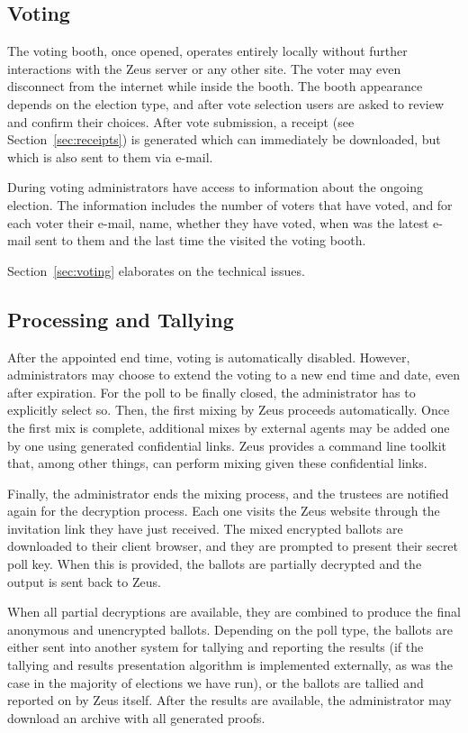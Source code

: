 \documentclass[letterpaper,10pt]{article}
\begin{document}
\subsection{Voting}
The voting booth, once opened, operates entirely locally without
further interactions with the Zeus server or any other site.
The voter may even disconnect from the internet while inside the booth.
The booth appearance depends on the election type, and after vote
selection users are asked to review and confirm their choices.
After vote submission, a receipt (see Section~\ref{sec:receipts}) is
generated which can immediately be downloaded, but which is also sent
to them via e-mail.

During voting administrators have access to information about the
ongoing election. The information includes the number of voters that
have voted, and for each voter their e-mail, name, whether they have
voted, when was the latest e-mail sent to them and the last time the
visited the voting booth.

Section~\ref{sec:voting} elaborates on the technical issues.

\subsection{Processing and Tallying}
After the appointed end time, voting is automatically disabled.
However, administrators may choose to extend the voting to a new end
time and date, even after expiration.
For the poll to be finally closed,
the administrator has to explicitly select so.
Then, the first mixing by Zeus proceeds automatically.
Once the first mix is complete, additional mixes by external agents
may be added one by one using generated confidential links.
Zeus provides a command line toolkit that, among other things, can
perform mixing given these confidential links.

Finally, the administrator ends the mixing process,
and the trustees are notified again for the decryption process.
Each one visits the Zeus website through the invitation link they have
just received.
The mixed encrypted ballots are downloaded to their client browser,
and they are prompted to present their secret poll key.
When this is provided, the ballots are partially decrypted 
and the output is sent back to Zeus.

When all partial decryptions are available, they are combined to produce
the final anonymous and unencrypted ballots.
Depending on the poll type, the ballots are either sent into another
system for tallying and reporting the results (if the tallying
and results presentation algorithm is implemented externally, as was
the case in the majority of elections we have run),
or the ballots are tallied and reported on by Zeus itself.
After the results are available,
the administrator may download an archive with all generated proofs.
\end{document}
